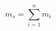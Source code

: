 \documentclass{article}
\begin{document}
\begin{equation*}
m_s = \sum_{i = 1}^{n} m_i
\end{equation*}
\end{document}
